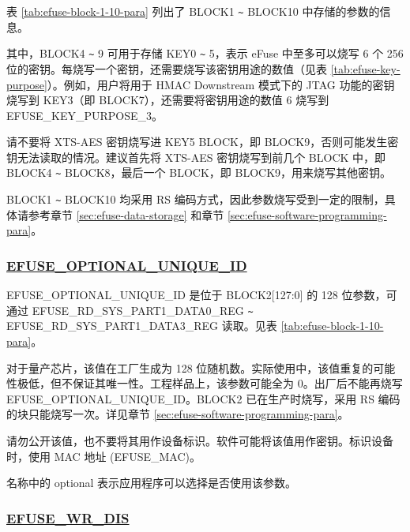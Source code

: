 \documentclass[main\_\_CN.tex]{subfiles}
\begin{document}



\clearpage
\begin{landscape}
表 \ref{tab:efuse-block-1-10-para} 列出了 BLOCK1 \verb+~+ BLOCK10 中存储的参数的信息。
    


其中，BLOCK4 \verb+~+ 9 可用于存储 KEY0 \verb+~+ 5，表示 eFuse 中至多可以烧写 6 个 256 位的密钥。每烧写一个密钥，还需要烧写该密钥用途的数值（见表 \ref{tab:efuse-key-purpose}）。例如，用户将用于 HMAC Downstream 模式下的 JTAG 功能的密钥烧写到 KEY\textcolor{myred}{3}（即 BLOCK7），还需要将密钥用途的数值 6 烧写到 EFUSE\_KEY\_PURPOSE\_\textcolor{myred}{3}。

\begin{tiplisting}
请不要将 XTS-AES 密钥烧写进 KEY5 BLOCK，即 BLOCK9，否则可能发生密钥无法读取的情况。建议首先将 XTS-AES 密钥烧写到前几个 BLOCK 中，即 BLOCK4 \verb+~+ BLOCK8，最后一个 BLOCK，即 BLOCK9，用来烧写其他密钥。
\end{tiplisting}


BLOCK1 \verb+~+ BLOCK10 均采用 RS 编码方式，因此参数烧写受到一定的限制，具体请参考章节 \ref{sec:efuse-data-storage} 和章节 \ref{sec:efuse-software-programming-para}。

\end{landscape}

\subsubsection{\texorpdfstring{\hyperref[fielddesc:EFUSEOPTIONALUNIQUEID]{EFUSE\_OPTIONAL\_UNIQUE\_ID}}{EFUSE\_OPTIONAL\_UNIQUE\_ID}}
\label{sec:efuse-optional-unique-id}

EFUSE\_OPTIONAL\_UNIQUE\_ID 是位于 BLOCK2[127:0] 的 128 位参数，可通过 EFUSE\_RD\_SYS\_PART1\_DATA0\_REG \verb+~+ EFUSE\_RD\_SYS\_PART1\_DATA3\_REG 读取。见表 \ref{tab:efuse-block-1-10-para}。

对于量产芯片，该值在工厂生成为 128 位随机数。实际使用中，该值重复的可能性极低，但不保证其唯一性。工程样品上，该参数可能全为 0。出厂后不能再烧写 EFUSE\_OPTIONAL\_UNIQUE\_ID。BLOCK2 已在生产时烧写，采用 RS 编码的块只能烧写一次。详见章节 \ref{sec:efuse-software-programming-para}。

请勿公开该值，也不要将其用作设备标识。软件可能将该值用作密钥。标识设备时，使用 MAC 地址 (EFUSE\_MAC)。

名称中的 optional 表示应用程序可以选择是否使用该参数。

\subsubsection{\hyperref[fielddesc:EFUSEWRDIS]{EFUSE\_WR\_DIS}}
\label{sec:efuse-wr-dis}
\end{document}
